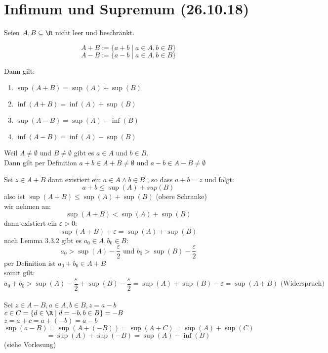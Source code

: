 \documentclass[12pt,a4paper,titlepage,draft]{article}
\begin{document}
	\section{Infimum und Supremum (26.10.18)}
	\begin{satz}
		Seien \(A, B \subseteq \R\) nicht leer und beschränkt.
		\begin{defi}
			\[A + B := \{a + b \; | \; a \in A, b \in B\}\]
			\[A - B := \{a - b \; | \; a \in A, b \in B\}\]
		\end{defi}
		Dann gilt:
		\begin{enumerate}
			\item \(\sup(A + B) = \sup(A) + \sup(B)\)
			\item \(\inf(A + B) = \inf(A) + \sup(B)\)
			\item \(\sup(A - B) = \sup(A) - \inf(B)\)
			\item \(\inf(A - B) = \inf(A) - \sup(B)\)
		\end{enumerate}
		Weil \(A \neq \emptyset\) und \(B \neq \emptyset\) gibt es \(a \in A\) und \(b \in B\).\\
		Dann gilt per Definition \(a+b \in A+B \neq \emptyset\) und \(a-b \in A-B \neq \emptyset\)
	\end{satz}
	\begin{bew}
		Sei \(z \in A + B\) dann existiert ein \(a \in A \wedge b \in B\) , so dass \(a + b = z\) und folgt:
		\[a + b \leq \sup(A) + sup(B)\]	
		also ist \(\sup(A+B) \leq \sup(A) + \sup(B)\) (obere Schranke)\\
		wir nehmen an:
		\[\sup(A+B) < \sup(A) + \sup(B)\]
		dann existiert ein \(\varepsilon > 0\):
		\[\sup(A+B) + \varepsilon = \sup(A) + \sup(B)\]
		nach Lemma 3.3.2 gibt es \(a_0 \in A, b_0 \in B\):
		\[a_0 > \sup(A) - \frac{\varepsilon}{2} \text{ und } b_0 > \sup(B) - \frac{\varepsilon}{2}\]
		per Definition ist \(a_0 + b_0 \in A + B\)\\
		somit gilt:
		\[a_0 + b_0 > \sup(A) - \frac{\varepsilon}{2} + \sup(B) - \frac{\varepsilon}{2} = \sup(A) + \sup(B) - \varepsilon = \sup(A+B) \text{ (Widerspruch)}\]\\
		Sei \(z \in A - B, a \in A, b \in B, z = a - b\)\\
		\(c \in C = \{d \in \R \; | \; d = -b, b \in B\} = -B\)\\
		\(z = a + c = a + (-b) = a - b\) 
		\[\sup(a-B) = \sup(A + (-B)) = \sup(A + C) = \sup(A) + \sup(C)\]
		\[= \sup(A) + \sup(-B) = \sup(A) - \inf(B)\] (siehe Vorlesung)
	\end{bew}
\end{document}
